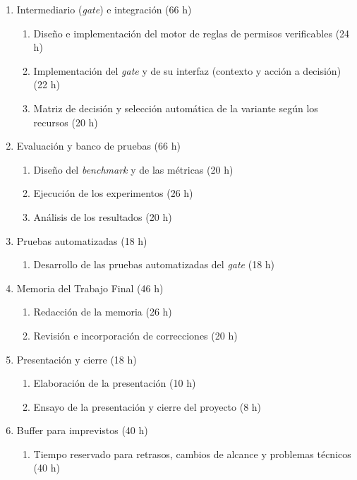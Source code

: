 \documentclass[
11pt, %
]{charter}
\begin{document}
\begin{enumerate}
\begin{enumerate}
	\item Comparación de versiones en distintas precisiones y su costo (24 h)
	\end{enumerate}
\item Intermediario (\textit{gate}) e integración (66 h)
	\begin{enumerate}
	\item Diseño e implementación del motor de reglas de permisos verificables (24 h)
	\item Implementación del \textit{gate} y de su interfaz (contexto y acción a decisión) (22 h)
	\item Matriz de decisión y selección automática de la variante según los recursos (20 h)
	\end{enumerate}
\item Evaluación y banco de pruebas (66 h)
	\begin{enumerate}
	\item Diseño del \textit{benchmark} y de las métricas (20 h)
	\item Ejecución de los experimentos (26 h)
	\item Análisis de los resultados (20 h)
	\end{enumerate}
\item Pruebas automatizadas (18 h)
	\begin{enumerate}
	\item Desarrollo de las pruebas automatizadas del \textit{gate} (18 h)
	\end{enumerate}
\item Memoria del Trabajo Final (46 h)
	\begin{enumerate}
	\item Redacción de la memoria (26 h)
	\item Revisión e incorporación de correcciones (20 h)
	\end{enumerate}
\item Presentación y cierre (18 h)
	\begin{enumerate}
	\item Elaboración de la presentación (10 h)
	\item Ensayo de la presentación y cierre del proyecto (8 h)
	\end{enumerate}
\item Buffer para imprevistos (40 h)
	\begin{enumerate}
	\item Tiempo reservado para retrasos, cambios de alcance y problemas técnicos (40 h)
	\end{enumerate}
\end{enumerate}
\end{document}
